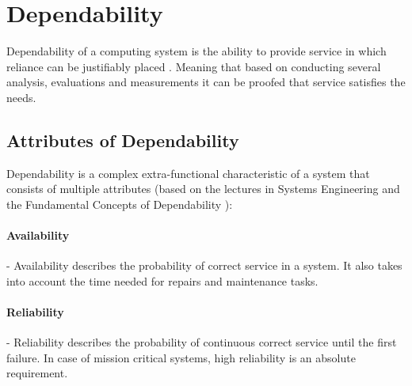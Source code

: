 

\section{Dependability}

Dependability of a computing system is the ability to provide service in which reliance can be justifiably placed \cite{DependabilityBMEMIT}. Meaning that based on conducting several analysis, evaluations and measurements it can be proofed that service satisfies the needs.

\subsection{Attributes of Dependability} \label{dependability-attributes}

Dependability is a complex extra-functional characteristic of a system that consists of multiple attributes (based on the lectures in Systems Engineering \cite{DependabilityBMEMIT} and the Fundamental Concepts of Dependability \cite{FundamentalConceptsOfDependability}):

\paragraph{Availability} - Availability describes the probability of correct service in a system. It also takes into account the time needed for repairs and maintenance tasks.

\paragraph{Reliability} - Reliability describes the probability of continuous correct service until the first failure. In case of mission critical systems, high reliability is an absolute requirement.

